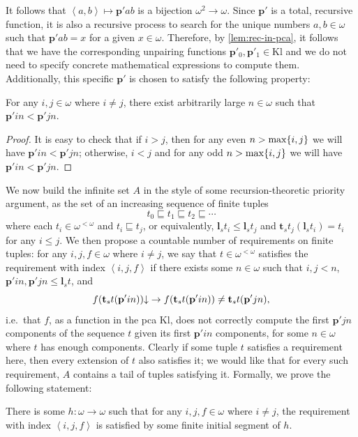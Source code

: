 \documentclass[12pt,openany]{book}
\theoremstyle{plain}
\theoremstyle{definition}
\newcommand\tuple[1]{\left\langle #1 \right\rangle}
\newcommand\KP{\mathrm{KP}}
\newcommand\Kl{\mathrm{Kl}}
\newcommand\bp{\mathbf{p}}
\newcommand\bl{\mathbf{l}}
\newcommand\bt{\mathbf{t}}
\begin{document}
It follows that $\tuple{a, b} \mapsto \bp' ab$ is a bijection $\omega^2 \rightarrow \omega$. Since $\bp'$ is a total, recursive function, it is also a recursive process to search for the unique numbers $a, b \in \omega$ such that $\bp' ab = x$ for a given $x \in \omega$. Therefore, by \autoref{lem:rec-in-pca}, it follows that we have the corresponding unpairing functions $\bp'_0, \bp'_1 \in \Kl$ and we do not need to specify concrete mathematical expressions to compute them. Additionally, this specific $\bp'$ is chosen to satisfy the following property:
\begin{lemma}
  \label{lem:max-pairing-property}
  For any $i, j \in \omega$ where $i \neq j$, there exist arbitrarily large $n \in \omega$ such that $\bp' in < \bp' jn$.
\end{lemma}

\begin{proof}
  It is easy to check that if $i > j$, then for any even $n > \max\mleft\{i, j\mright\}$ we will have $\bp' in < \bp' jn$; otherwise, $i < j$ and for any odd $n > \max\mleft\{i, j\mright\}$ we will have $\bp' in < \bp' jn$.
\end{proof}

We now build the infinite set $A$ in the style of some recursion-theoretic priority argument, as the set of an increasing sequence of finite tuples
\[t_0 \sqsubseteq t_1 \sqsubseteq t_2 \sqsubseteq \cdots\]
where each $t_i \in \omega^{< \omega}$ and $t_i \sqsubseteq t_j$, or equivalently, $\bl_s t_i \leq \bl_s t_j$ and $\bt_s t_j \left(\bl_s t_i\right) = t_i$ for any $i \leq j$. We then propose a countable number of requirements on finite tuples: for any $i, j, f \in \omega$ where $i \neq j$, we say that $t \in \omega^{< \omega}$ satisfies the requirement with index $\tuple{i, j, f}$ if there exists some $n \in \omega$ such that $i, j < n$, $\bp' in, \bp' jn \leq \bl_s t$, and
\[f \mleft(\bt_s t \mleft(\bp' in\mright)\mright) {\downarrow} \rightarrow f\mleft(\bt_s t \mleft(\bp' in\mright)\mright) \neq \bt_s t \mleft(\bp' jn\mright),\]
i.e.\ that $f$, as a function in the pca $\Kl$, does not correctly compute the first $\bp' jn$ components of the sequence $t$ given its first $\bp' in$ components, for some $n \in \omega$ where $t$ has enough components. Clearly if some tuple $t$ satisfies a requirement here, then every extension of $t$ also satisfies it; we would like that for every such requirement, $A$ contains a tail of tuples satisfying it. Formally, we prove the following statement:
\begin{proposition}[$\KP$]
  \label{prop:mltt-real-non-comp-path}
  There is some $h : \omega \rightarrow \omega$ such that for any $i, j, f \in \omega$ where $i \neq j$, the requirement with index $\tuple{i, j, f}$ is satisfied by some finite initial segment of $h$.
\end{proposition}
\end{document}
